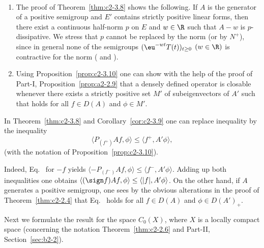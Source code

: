 \begin{remark}\label{rem:c2-3.11} ~ 
\begin{enumerate}[\upshape (i), wide, labelindent=.25em]%
\item \label{rem:c2-3.11-1}
The proof of Theorem~\ref{thm:c2-3.8}   shows the following. 
If\/ $A$ is the generator of a positive semigroup and $E'$ contains strictly
positive linear forms, then there exist a continuous half-norm $p$ on
$E$ and $w \in \R$ such that $A - w$ is $p$-dissipative. 
We stress that $p$ cannot be replaced by the norm (or by $N^{+}$), since in general none of the semigroups $(\eu^{-wt}T(t))_{t \geq 0}$ $(w \in \R)$ is contractive for the norm (\cf \textcite{derndinger:1984} and \textcite{battydavies:1983}).
\item  \label{rem:c2-3.11-2}
Using Proposition~\ref{prop:c2-3.10}   one can show with the help of the proof of 
Part-I, Proposition~\ref{prop:a2-2.9} that a densely defined operator is closable whenever
there exists a strictly positive set $M'$ of subeigenvectors of\/ $A'$
such that    holds for all $f \in D(A)$ and $\phi \in M'$.
\end{enumerate}
\end{remark}
\begin{remark}\label{rem:c2-3.12}
In Theorem~\ref{thm:c2-3.8} and Corollary~\ref{cor:c2-3.9}  one can replace inequality    by the inequality
\begin{equation}\label{eq:c2-3.6}
\langle P_{(f^{+})}Af,\phi \rangle \leq \langle f^{+},A'\phi \rangle,
\end{equation}
(with the notation of Proposition~\ref{prop:c2-3.10}).

Indeed, Eq.~ for $-f$ yields $\langle -P_{(f^{-})}Af,\phi \rangle \leq \langle f^{-},A'\phi \rangle$. 
Adding up both inequalities one obtains $\langle(\sign f)Af,\phi \rangle \leq \langle |f|,A'\phi \rangle$.
On the other hand, if\/ $A$ generates a positive semigroup, one sees by
the obvious alterations in the proof of Theorem~\ref{thm:c2-2.4}   that Eq.~ holds for all $f \in D(A)$ and $\phi \in D(A')_{+}$. 

Next we formulate the result for the space $C_{0}(X)$, where $X$ is a locally compact space (concerning the notation \cf Theorem~\ref{thm:c2-2.6} and Part-II, Section~\ref{sec:b2-2}).
\end{remark}
